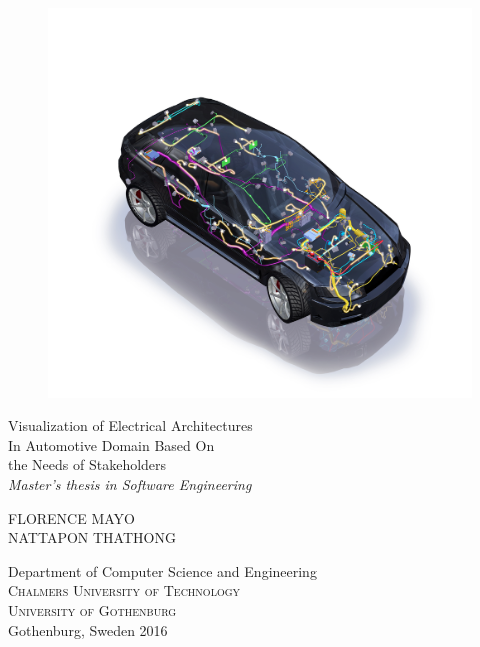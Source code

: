 
\begin{titlepage}
			
\addtolength{\voffset}{2cm}

\begin{figure}[H]
\centering
\vspace{2cm}	%
\includegraphics[width=0.7\linewidth]{figure/cover.jpg}
\end{figure}

\mbox{}
\vfill
\renewcommand{\familydefault}{\rmdefault} \normalfont
{\Huge
Visualization of Electrical Architectures\\[0.2cm]
In Automotive Domain Based On\\[0.2cm]
the Needs of Stakeholders}\\[0.4cm]

{\large\textit{Master's thesis in Software Engineering}} \setlength{\parskip}{1cm}

{\large FLORENCE MAYO} \\[0.2cm]
{\large NATTAPON THATHONG} \setlength{\parskip}{1.1cm}

Department of Computer Science and Engineering \\
\textsc{Chalmers University of Technology} \\
\textsc{University of Gothenburg} \\
Gothenburg, Sweden 2016

\renewcommand{\familydefault}{\rmdefault} \normalfont %
\end{titlepage}


